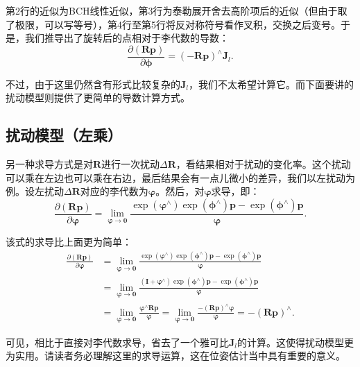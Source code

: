 第2行的近似为BCH线性近似，第3行为泰勒展开舍去高阶项后的近似（但由于取了极限，可以写等号），第4行至第5行将反对称符号看作叉积，交换之后变号。于是，我们推导出了旋转后的点相对于李代数的导数：
\begin{equation}
\frac{{\partial \left( { \bm{Rp}} \right)}}{{\partial \bm{\phi} }} = {\left( { - \bm{Rp}} \right)^ \wedge }{\bm{J}_l}.
\end{equation}

不过，由于这里仍然含有形式比较复杂的$\bm{J}_l$，我们不太希望计算它。而下面要讲的扰动模型则提供了更简单的导数计算方式。

\subsection{扰动模型（左乘）}
另一种求导方式是对$\bm{R}$进行一次扰动$\Delta \bm{R}$，看结果相对于扰动的变化率。这个扰动可以乘在左边也可以乘在右边，最后结果会有一点儿微小的差异，我们以左扰动为例。设左扰动$\Delta \bm{R}$对应的李代数为$\bm{\varphi}$。然后，对$\bm{\varphi}$求导，即：
\begin{equation}
\frac{{\partial \left( {\bm{Rp}} \right)}}{{\partial \bm{\varphi} }} = \mathop {\lim }\limits_{\bm{\varphi}  \to \bm{0}} \frac{{\exp \left( {{\bm{\varphi} ^ \wedge }} \right)\exp \left( {{\bm{\phi} ^ \wedge }} \right)\bm{p} - \exp \left( {{\bm{\phi} ^ \wedge }} \right)\bm{p}}}{\bm{\varphi} }.
\end{equation}

该式的求导比上面更为简单：
\begin{align*}
\frac{{\partial \left( {\bm{Rp}} \right)}}{{\partial \bm{\varphi} }} &= \mathop {\lim }\limits_{\bm{\varphi}  \to \bm{0}} \frac{{\exp \left( {{\bm{\varphi} ^ \wedge }} \right)\exp \left( {{\bm{\phi} ^ \wedge }} \right)\bm{p} - \exp \left( {{\bm{\phi} ^ \wedge }} \right)\bm{p}}}{ \bm{\varphi} }\\
&= \mathop {\lim }\limits_{\bm{\varphi } \to \bm{0}} \frac{{\left( {\bm{I} + {\bm{\varphi }^ \wedge }} \right)\exp \left( {{\bm{\phi} ^ \wedge }} \right)\bm{p} - \exp \left( {{\bm{\phi} ^ \wedge }} \right)\bm{p}}}{\bm{\varphi} }\\
&= \mathop {\lim }\limits_{\bm{\varphi}  \to \bm{0}} \frac{{{\bm{\varphi} ^ \wedge }\bm{Rp}}}{\bm{\varphi} } = \mathop {\lim }\limits_{\bm{\varphi}  \to \bm{0}} \frac{{ - {{\left( \bm{Rp} \right)}^ \wedge }\bm{\varphi} }}{\bm{\varphi} } =  - {\left( \bm{Rp} \right)^ \wedge }.
\end{align*}

可见，相比于直接对李代数求导，省去了一个雅可比$\bm{J}_l$的计算。这使得扰动模型更为实用。请读者务必理解这里的求导运算，这在位姿估计当中具有重要的意义。

